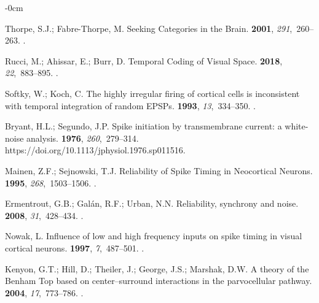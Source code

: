 \documentclass[brainsci, %
               review,accept,pdftex,moreauthors
               ]{Definitions/mdpi}
\begin{document}
\begin{adjustwidth}{-\extralength}{0cm}
\begin{thebibliography}{999}
Thorpe, S.J.; Fabre-Thorpe, M.
\newblock Seeking {Categories} in the {Brain}.
 {\bf 2001}, {\em 291},~260--263.
.

Rucci, M.; Ahissar, E.; Burr, D.
\newblock Temporal {Coding} of {Visual} {Space}.
 {\bf 2018}, {\em 22},~883--895.\linebreak
{}.

Softky, W.; Koch, C.
\newblock The highly irregular firing of cortical cells is inconsistent with
  temporal integration of random {EPSPs}.
 {\bf 1993}, {\em 13},~334--350.
.

Bryant, H.L.; Segundo, J.P.
\newblock Spike initiation by transmembrane current: a white-noise analysis.
 {\bf 1976}, {\em 260},~279--314.
  {{https://doi.org/10.1113/jphysiol.1976.sp011516}}.

Mainen, Z.F.; Sejnowski, T.J.
\newblock Reliability of {Spike} {Timing} in {Neocortical} {Neurons}.
 {\bf 1995}, {\em 268},~1503--1506.\linebreak
{}.

Ermentrout, G.B.; Galán, R.F.; Urban, N.N.
\newblock Reliability, synchrony and noise.
 {\bf 2008}, {\em 31},~428--434.
.

Nowak, L.
\newblock Influence of low and high frequency inputs on spike timing in visual
  cortical neurons.
 {\bf 1997}, {\em 7},~487--501.
.

Kenyon, G.T.; Hill, D.; Theiler, J.; George, J.S.; Marshak, D.W.
\newblock A theory of the {Benham} {Top} based on center–surround
  interactions in the parvocellular pathway.
 {\bf 2004}, {\em 17},~773--786.
.


\end{thebibliography}
\end{adjustwidth}
\end{document}
